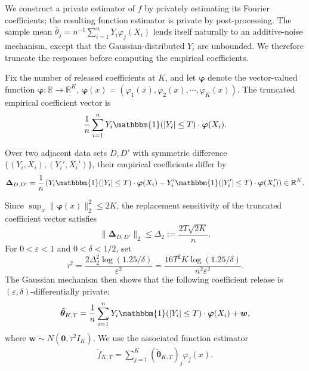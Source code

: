\documentclass[letterpaper,12pt]{article}
\numberwithin{equation}{section}
\theoremstyle{plain}
\numberwithin{Theorem}{section}
\numberwithin{proposition}{section}
\numberwithin{Lemma}{section}
{
	\theoremstyle{definition}
	\newtheorem{Definition}{Definition}
	\newtheorem{example}{Example}
	\numberwithin{example}{section}
	\newtheorem{fact}{Fact}
	\numberwithin{fact}{section}
	\newtheorem{remark}{Remark}
}
\newcommand{\rev}[1]{#1}
\newcommand{\1}{\mathbbm{1}}
\def\bth{{\boldsymbol{\theta}}}
\def\R{{\mathbb R}}
\begin{document}
		We construct a private estimator of $f$ by privately estimating its Fourier coefficients; the resulting function estimator is private by post-processing. The sample mean $\hat\theta_j = n^{-1}\sum_{i=1}^n Y_i\varphi_j(X_i)$ lends itself naturally to an additive-noise mechanism, except that the Gaussian-distributed $Y_i$ are unbounded. We therefore truncate the responses before computing the empirical coefficients.
	
		Fix the number of released coefficients at $K$, and let $\bm\varphi$ denote the vector-valued function $\bm\varphi: \R \to \R^K$, $\bm \varphi(x) = \left(\varphi_1(x), \varphi_2(x), \cdots, \varphi_K(x)\right)$. The truncated empirical coefficient vector is
	\begin{align*}
		\frac{1}{n} \sum_{i=1}^n Y_i\1(|Y_i| \leq T) \cdot \bm \varphi(X_i).
	\end{align*}
	
	
	Over two adjacent data sets $D, D'$ with symmetric difference $\{(Y_i, X_i), (Y_i', X_i')\}$, their empirical coefficients differ by
	\begin{align*}
		\bm\Delta_{D, D'} = \frac{1}{n} \left(Y_i\1(|Y_i| \leq T) \cdot \bm \varphi(X_i) - Y'_i\1(|Y'_i| \leq T) \cdot \bm \varphi(X'_i)\right) \in \R^K.
	\end{align*}
	
		{Since $\sup_x\|\bm\varphi(x)\|_2^2\leq2K$, the replacement sensitivity of the truncated coefficient vector satisfies
	\[
	\|\bm\Delta_{D,D'}\|_2\leq\Delta_2:=\frac{2T\sqrt{2K}}n.
	\]
	For $0<\varepsilon<1$ and $0<\delta<1/2$, set
	\[
	\tau^2=\frac{2\Delta_2^2\log(1.25/\delta)}{\varepsilon^2}
	=\frac{16T^2K\log(1.25/\delta)}{n^2\varepsilon^2}.
	\]
	The Gaussian mechanism then shows that the following coefficient release is $(\varepsilon,\delta)$-differentially private:}
	\begin{align*}
		\tilde \bth_{K, T}  =  \frac{1}{n} \sum_{i=1}^n Y_i\1(|Y_i| \leq T) \cdot \bm \varphi(X_i) + \bm w, 
	\end{align*}
	\rev{where $\bm w\sim N(\bm0,\tau^2I_K)$. We use the associated function estimator}
	\begin{align}\label{eq: nonparametric estimator definition}
		\tilde f_{K, T} = \sum_{j=1}^K \left(\tilde \bth_{K, T}\right)_j\varphi_j(x).
	\end{align}
	
\end{document}
